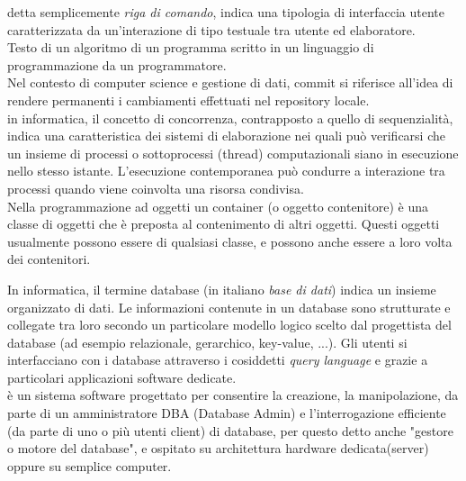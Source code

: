 \documentclass{scalatekids-article}
\begin{document}
 detta semplicemente \textit{riga di comando}, indica una tipologia di interfaccia utente caratterizzata da un'interazione di tipo testuale tra utente ed elaboratore.
\\

 Testo di un algoritmo di un programma scritto in un linguaggio di programmazione da un programmatore.
\\

 Nel contesto di computer science e gestione di dati, commit si riferisce all'idea di rendere permanenti i cambiamenti effettuati nel repository locale.
\\

 in informatica, il concetto di concorrenza, contrapposto a quello di sequenzialità, indica una caratteristica dei sistemi di elaborazione nei quali può verificarsi che un insieme di processi o sottoprocessi (thread) computazionali siano in esecuzione nello stesso istante.
L'esecuzione contemporanea può condurre a interazione tra processi quando viene coinvolta una risorsa condivisa.
\\

 Nella programmazione ad oggetti un container (o oggetto contenitore) è una classe di oggetti che è preposta al contenimento di altri oggetti.
Questi oggetti usualmente possono essere di qualsiasi classe, e possono anche essere a loro volta dei contenitori.
\\


 In informatica, il termine database (in italiano \textit{base di dati}) indica un insieme organizzato di dati.
Le informazioni contenute in un database sono strutturate e collegate tra loro secondo un particolare modello logico scelto dal progettista del database (ad esempio relazionale, gerarchico, key-value, ...).
Gli utenti si interfacciano con i database attraverso i cosiddetti \textit{query language} e grazie a particolari applicazioni software dedicate.
\\

 è un sistema software progettato per consentire la creazione, la manipolazione, da parte di un amministratore DBA (Database Admin) e l'interrogazione efficiente (da parte di uno o più utenti client) di database, per questo detto anche "gestore o motore del database", e ospitato su architettura hardware dedicata(server) oppure su semplice computer.
\\
\end{document}
